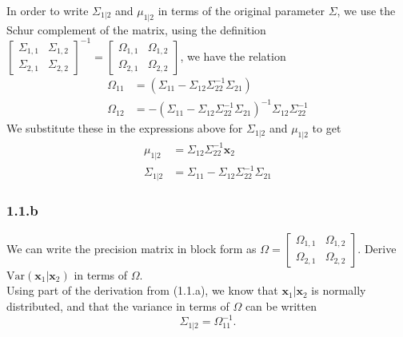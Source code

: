 \documentclass[12pt]{article}
\begin{document}
In order to write $\Sigma_{1|2}$ and $\mu_{1|2}$ in terms of the original parameter $\Sigma$, we use the Schur complement of the matrix, using the definition
$\left[ \begin{smallmatrix} \Sigma_{1,1}& \Sigma_{1,2} \\ \Sigma_{2,1} & \Sigma_{2,2} \end{smallmatrix} \right]^{-1} = 
 \left[ \begin{smallmatrix} \Omega_{1,1}& \Omega_{1,2} \\ \Omega_{2,1} & \Omega_{2,2} \end{smallmatrix} \right]$,
 we have the relation
 \begin{equation}
    \begin{split}
        \Omega_{11} &= (\Sigma_{11} - \Sigma_{12} \Sigma_{22}^{-1} \Sigma_{21})\\
        \Omega_{12} &= - (\Sigma_{11} - \Sigma_{12} \Sigma_{22}^{-1} \Sigma_{21})^{-1} \Sigma_{12} \Sigma_{22}^{-1}
    \end{split}
\end{equation}
We substitute these in the expressions above for $\Sigma_{1|2}$ and $\mu_{1|2}$ to get
\begin{equation}
    \begin{split}
        \mu_{1|2} &= \Sigma_{12} \Sigma_{22}^{-1} \textbf{x}_2 \\
        \Sigma_{1|2} &=  \Sigma_{11} - \Sigma_{12} \Sigma_{22}^{-1} \Sigma_{21}
    \end{split}
\end{equation}


\subsubsection*{1.1.b}
We can write the precision matrix in block form as $\Omega = \left[ 
\begin{smallmatrix} \Omega_{1,1} & \Omega_{1,2} \\ \Omega_{2,1} & \Omega_{2,2}
\end{smallmatrix} \right]$.
Derive $\text{Var}(\textbf{x}_1 | \textbf{x}_2)$ in terms of $\Omega$.\\

Using part of the derivation from (1.1.a), we know that $\textbf{x}_1 | \textbf{x}_2$ is normally distributed, and that the variance in terms of $\Omega$ can be written
\begin{equation}
    \Sigma_{1|2} = \Omega_{11}^{-1}.
\end{equation}
\end{document}
